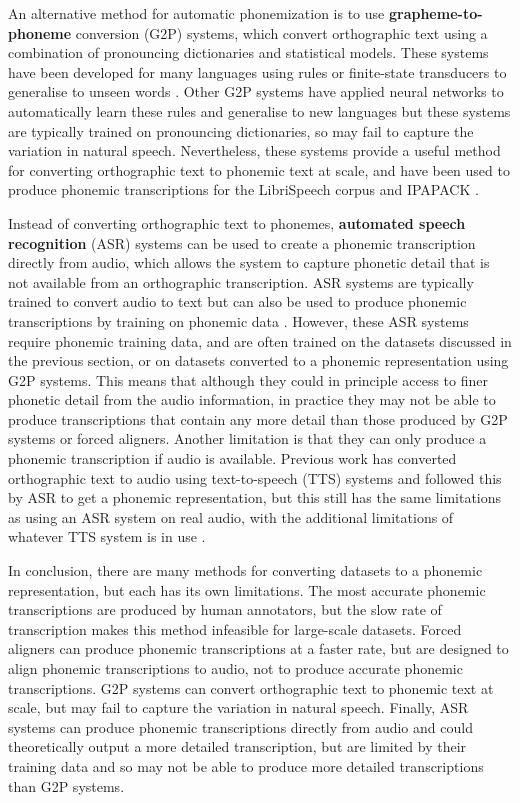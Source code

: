 An alternative method for automatic phonemization is to use \textbf{grapheme-to-phoneme} conversion (G2P) systems, which convert orthographic text using a combination of pronouncing dictionaries and statistical models. These systems have been developed for many languages using rules or finite-state transducers to generalise to unseen words \citep{Mortensen-et-al:2018, johnson2020g2p, hasegawa-2020-g2pmultilingual, Bernard2021}. Other G2P systems have applied neural networks to automatically learn these rules and generalise to new languages \citep{NOVAK_MINEMATSU_HIROSE_2016, Zhu2022} but these systems are typically trained on pronouncing dictionaries, so may fail to capture the variation in natural speech. Nevertheless, these systems provide a useful method for converting orthographic text to phonemic text at scale, and have been used to produce phonemic transcriptions for the LibriSpeech corpus \citep{Kahn_2020} and IPAPACK \citep{zhu-etal-2024-taste}.

Instead of converting orthographic text to phonemes, \textbf{automated speech recognition} (ASR) systems can be used to create a phonemic transcription directly from audio, which allows the system to capture phonetic detail that is not available from an orthographic transcription. ASR systems are typically trained to convert audio to text \citep{chan2015listen} but can also be used to produce phonemic transcriptions by training on phonemic data \citep{feng-2023-language-universal-phonetic}. However, these ASR systems require phonemic training data, and are often trained on the datasets discussed in the previous section, or on datasets converted to a phonemic representation using G2P systems. This means that although they could in principle access to finer phonetic detail from the audio information, in practice they may not be able to produce transcriptions that contain any more detail than those produced by G2P systems or forced aligners. Another limitation is that they can only produce a phonemic transcription if audio is available. Previous work has converted orthographic text to audio using text-to-speech (TTS) systems and followed this by ASR to get a phonemic representation, but this still has the same limitations as using an ASR system on real audio, with the additional limitations of whatever TTS system is in use .  

In conclusion, there are many methods for converting datasets to a phonemic representation, but each has its own limitations. The most accurate phonemic transcriptions are produced by human annotators, but the slow rate of transcription makes this method infeasible for large-scale datasets. Forced aligners can produce phonemic transcriptions at a faster rate, but are designed to align phonemic transcriptions to audio, not to produce accurate phonemic transcriptions. G2P systems can convert orthographic text to phonemic text at scale, but may fail to capture the variation in natural speech. Finally, ASR systems can produce phonemic transcriptions directly from audio and could theoretically output a more detailed transcription, but are limited by their training data and so may not be able to produce more detailed transcriptions than G2P systems.


